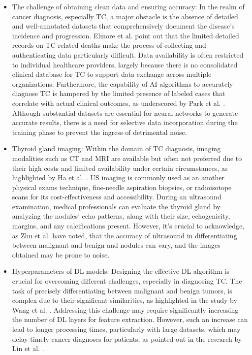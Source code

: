 \documentclass[a4paper,fleqn]{cas-sc}
\begin{document}
\begin{itemize}[leftmargin=*]
\item The challenge of obtaining clean data and ensuring accuracy: In the realm of cancer diagnosis, especially TC, a major obstacle is the absence of detailed and well-annotated datasets that comprehensively document the disease's incidence and progression. Elmore et al. \cite{elmore2021blueprint} point out that the limited detailed records on TC-related deaths make the process of collecting and authenticating data particularly difficult. Data availability is often restricted to individual healthcare providers, largely because there is no consolidated clinical database for TC to support data exchange across multiple organizations. Furthermore, the capability of \ac{AI} algorithms to accurately diagnose TC is hampered by the limited presence of labeled cases that correlate with actual clinical outcomes, as underscored by Park et al. \cite{park2021key}. Although substantial datasets are essential for neural networks to generate accurate results, there is a need for selective data incorporation during the training phase to prevent the ingress of detrimental noise.

\item Thyroid gland imaging:  Within the domain of TC diagnosis, imaging modalities such as \ac{CT} and \ac{MRI} are available but often not preferred due to their high costs and limited availability under certain circumstances, as highlighted by Ha et al. \cite{ha2021applications}. \Ac{US} imaging is commonly used as an another physical exams technique, fine-needle aspiration biopsies, or radioisotope scans  for its cost-effectiveness and accessibility. During an ultrasound examination, medical professionals can evaluate the thyroid gland by analyzing the nodules' echo patterns, along with their size, echogenicity, margins, and any calcifications present. However, it's crucial to acknowledge, as Zhu et al. \cite{zhu2021generic} have noted, that the accuracy of ultrasound in differentiating between malignant and benign and  nodules can vary, and the images obtained may be prone to noise.

\item Hyperparameters of DL models:  Designing  the effective \ac{DL} algorithm is crucial for overcoming different challenges, especially in diagnosing TC. The task of precisely differentiating between malignant and benign  tumors, is complex due to their significant similarities, as highlighted in the study by Wang et al. \cite{wang2022soft}. Addressing this challenge may require significantly increasing the number of DL layers for feature extraction. However, such an increase can lead to longer processing times, particularly with large datasets, which may delay timely cancer diagnoses for patients, as pointed out in the research by Lin et al. \cite{lin2021deep}.


\end{itemize}
\end{document}
